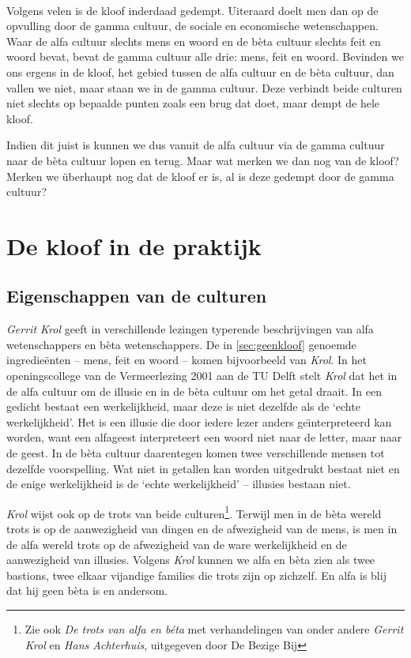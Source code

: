 \paragraph{}

Volgens velen is de kloof inderdaad gedempt. Uiteraard doelt men dan op de opvulling door de gamma cultuur, de sociale en economische wetenschappen. Waar de alfa cultuur slechts mens en woord en de b\`eta cultuur slechts feit en woord bevat, bevat de gamma cultuur alle drie: mens, feit en woord. Bevinden we ons ergens in de kloof, het gebied tussen de alfa cultuur en de b\`eta cultuur, dan vallen we niet, maar staan we in de gamma cultuur. Deze verbindt beide culturen niet slechts op bepaalde punten zoals een brug dat doet, maar dempt de hele kloof.

Indien dit juist is kunnen we dus vanuit de alfa cultuur via de gamma cultuur naar de b\`eta cultuur lopen en terug. Maar wat merken we dan nog van de kloof? Merken we \"uberhaupt nog dat de kloof er is, al is deze gedempt door de gamma cultuur?


\section{De kloof in de praktijk}


\subsection{Eigenschappen van de culturen}

\emph{Gerrit Krol} geeft in verschillende lezingen typerende beschrijvingen van alfa wetenschappers en b\`eta wetenschappers. De in \ref{sec:geenkloof} genoemde ingredie\"enten -- mens, feit en woord -- komen bijvoorbeeld van \emph{Krol}. In het openingscollege van de Vermeerlezing 2001 aan de TU Delft stelt \emph{Krol}\cite{Krol} dat het in de alfa cultuur om de illusie en in de b\`eta cultuur om het getal draait. In een gedicht bestaat een werkelijkheid, maar deze is niet dezelfde als de `echte werkelijkheid'. Het is een illusie die door iedere lezer anders ge\"\i{}nterpreteerd kan worden, want een alfageest interpreteert een woord niet naar de letter, maar naar de geest. In de b\`eta cultuur daarentegen komen twee verschillende mensen tot dezelfde voorspelling. Wat niet in getallen kan worden uitgedrukt bestaat niet en de enige werkelijkheid is de `echte werkelijkheid' -- illusies bestaan niet.

\emph{Krol} wijst ook op de trots van beide culturen\footnote{Zie ook \emph{De trots van alfa en b\'eta}\cite{Krolea} met verhandelingen van onder andere \emph{Gerrit Krol} en \emph{Hans Achterhuis}, uitgegeven door De Bezige Bij}. Terwijl men in de b\`eta wereld trots is op de aanwezigheid van dingen en de afwezigheid van de mens, is men in de alfa wereld trots op de afwezigheid van de ware werkelijkheid en de aanwezigheid van illusies. Volgens \emph{Krol} kunnen we alfa en b\`eta zien als twee bastions, twee elkaar vijandige families die trots zijn op zichzelf. En alfa is blij dat hij geen b\`eta is en andersom.


